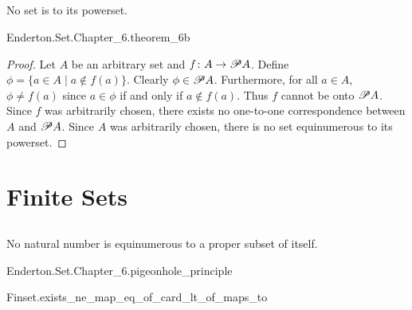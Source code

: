 \documentclass{report}
\begin{document}
\subsection{}%

  \begin{theorem}[6B]
    No set is  to its powerset.
  \end{theorem}

    {Enderton.Set.Chapter\_6.theorem\_6b}

  \begin{proof}
    Let $A$ be an arbitrary set and $f \colon A \rightarrow \mathscr{P}A$.
    Define $\phi = \{a \in A \mid a \not\in f(a)\}$.
    Clearly $\phi \in \mathscr{P}A$.
    Furthermore, for all $a \in A$, $\phi \neq f(a)$ since $a \in \phi$ if and
      only if $a \not\in f(a)$.
    Thus $f$ cannot be onto $\mathscr{P}A$.
    Since $f$ was arbitrarily chosen, there exists no one-to-one correspondence
      between $A$ and $\mathscr{P}A$.
    Since $A$ was arbitrarily chosen, there is no set equinumerous to its
      powerset.
  \end{proof}

\section{Finite Sets}%

\subsection{}%

  \begin{theorem}
    No natural number is equinumerous to a proper subset of itself.
  \end{theorem}

    {Enderton.Set.Chapter\_6.pigeonhole\_principle}

    {Finset.exists\_ne\_map\_eq\_of\_card\_lt\_of\_maps\_to}
\end{document}
